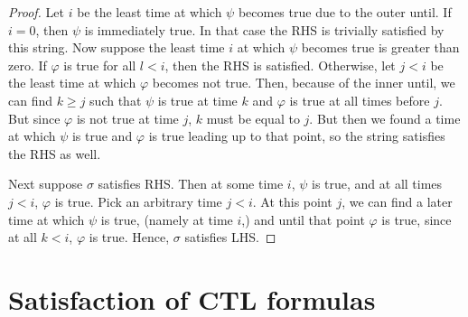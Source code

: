 \documentclass[letterpaper,11pt]{article}
\newcommand{\question}{\section}
\begin{document}
\begin{enumerate}
\begin{proof}
            Let $i$ be the least time at which $\psi$ becomes true due to the
            outer until.
            If $i = 0$, then $\psi$ is immediately true. In that case the RHS
            is trivially satisfied by this string.
            Now suppose the least time $i$ at which $\psi$ becomes true is
            greater than zero.
            If $\varphi$ is true for all $l < i$, then the RHS is satisfied.
            Otherwise, let $j < i$ be the least time at which $\varphi$ becomes
            not true. Then, because of the inner until, we can find $k \geq j$
            such that $\psi$ is true at time $k$ and $\varphi$ is true at all
            times before $j$. But since $\varphi$ is not true at time $j$, $k$
            must be equal to $j$. But then we found a time at which $\psi$ is
            true and $\varphi$ is true leading up to that point, so the string
            satisfies the RHS as well.

            Next suppose $\sigma$ satisfies RHS.
            Then at some time $i$, $\psi$ is true, and at all times $j < i$,
            $\varphi$ is true.
            Pick an arbitrary time $j < i$. At this point $j$, we can find a
            later time at which $\psi$ is true, (namely at time $i$,) and until
            that point $\varphi$ is true, since at all $k < i$, $\varphi$ is
            true. Hence, $\sigma$ satisfies LHS.
        \end{proof}
\end{enumerate}

\question{Satisfaction of CTL formulas}
\end{document}
